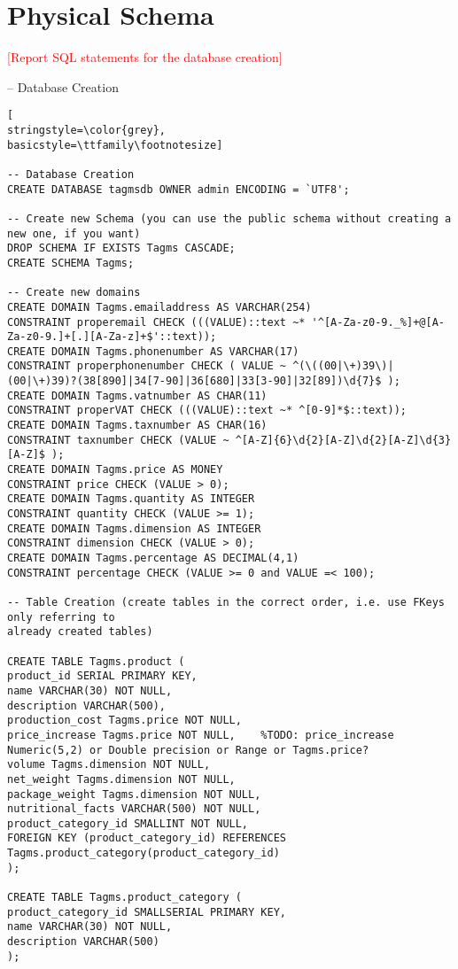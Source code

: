 \section{Physical Schema}
\textcolor{red}{[Report SQL statements for the database creation]}

-- Database Creation
\begin{lstlisting}[
stringstyle=\color{grey},
basicstyle=\ttfamily\footnotesize]

-- Database Creation
CREATE DATABASE tagmsdb OWNER admin ENCODING = `UTF8';

-- Create new Schema (you can use the public schema without creating a new one, if you want)
DROP SCHEMA IF EXISTS Tagms CASCADE;
CREATE SCHEMA Tagms;

-- Create new domains
CREATE DOMAIN Tagms.emailaddress AS VARCHAR(254)
CONSTRAINT properemail CHECK (((VALUE)::text ~* '^[A-Za-z0-9._%]+@[A-Za-z0-9.]+[.][A-Za-z]+$'::text));
CREATE DOMAIN Tagms.phonenumber AS VARCHAR(17)
CONSTRAINT properphonenumber CHECK ( VALUE ~ ^(\((00|\+)39\)|(00|\+)39)?(38[890]|34[7-90]|36[680]|33[3-90]|32[89])\d{7}$ );
CREATE DOMAIN Tagms.vatnumber AS CHAR(11)
CONSTRAINT properVAT CHECK (((VALUE)::text ~* ^[0-9]*$::text));
CREATE DOMAIN Tagms.taxnumber AS CHAR(16)
CONSTRAINT taxnumber CHECK (VALUE ~ ^[A-Z]{6}\d{2}[A-Z]\d{2}[A-Z]\d{3}[A-Z]$ );
CREATE DOMAIN Tagms.price AS MONEY
CONSTRAINT price CHECK (VALUE > 0);
CREATE DOMAIN Tagms.quantity AS INTEGER
CONSTRAINT quantity CHECK (VALUE >= 1);
CREATE DOMAIN Tagms.dimension AS INTEGER
CONSTRAINT dimension CHECK (VALUE > 0);
CREATE DOMAIN Tagms.percentage AS DECIMAL(4,1)
CONSTRAINT percentage CHECK (VALUE >= 0 and VALUE =< 100);

-- Table Creation (create tables in the correct order, i.e. use FKeys only referring to
already created tables)

CREATE TABLE Tagms.product (
product_id SERIAL PRIMARY KEY,
name VARCHAR(30) NOT NULL,
description VARCHAR(500),
production_cost Tagms.price NOT NULL,
price_increase Tagms.price NOT NULL,	%TODO: price_increase Numeric(5,2) or Double precision or Range or Tagms.price?
volume Tagms.dimension NOT NULL,
net_weight Tagms.dimension NOT NULL,
package_weight Tagms.dimension NOT NULL,
nutritional_facts VARCHAR(500) NOT NULL,
product_category_id SMALLINT NOT NULL,
FOREIGN KEY (product_category_id) REFERENCES Tagms.product_category(product_category_id)
);

CREATE TABLE Tagms.product_category (
product_category_id SMALLSERIAL PRIMARY KEY,
name VARCHAR(30) NOT NULL,
description VARCHAR(500)
);


\end{lstlisting}
